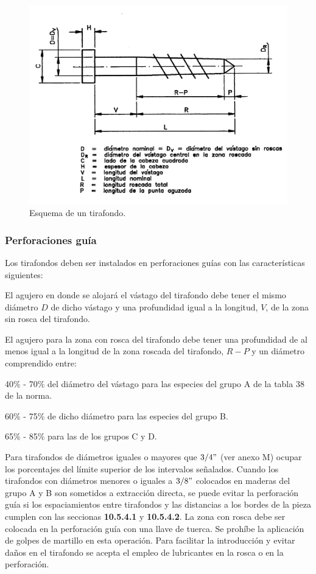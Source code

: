 \begin{figure}[H]
\centering
\includegraphics[width=0.9\linewidth]{Imagenes/figura_28.pdf}%
\caption{Esquema de un tirafondo. \cite{nch1198}}
\label{fig:nch_28}
\end{figure}

\newpage

\subsubsection{Perforaciones guía}
Los tirafondos deben ser instalados en perforaciones guías con las características siguientes:
\begin{itemize*}
	\item El agujero en donde se alojará el vástago del tirafondo debe tener el mismo diámetro $D$ de dicho vástago y una profundidad igual a la longitud, $V$, de la zona sin rosca del tirafondo.
	\item El agujero para la zona con rosca del tirafondo debe tener una profundidad de al menos igual a la longitud de la zona roscada del tirafondo, $R-P$ y un diámetro comprendido entre:
	\begin{itemize*}
		\item 40\% - 70\% del diámetro del vástago para las especies del grupo A de la tabla 38 de la norma.
		\item 60\% - 75\% de dicho diámetro para las especies del grupo B.
		\item 65\% - 85\% para las de los grupos C y D.
	\end{itemize*}
\end{itemize*}
Para tirafondos de diámetros iguales o mayores que $3/4"$ (ver anexo M) ocupar los porcentajes del límite superior de los intervalos señalados. Cuando los tirafondos con diámetros menores o iguales a $3/8"$ colocados en maderas del grupo A y B son sometidos a extracción directa, se puede evitar la perforación guía si los espaciamientos entre tirafondos y las distancias a los bordes de la pieza cumplen con las seccionas \textbf{10.5.4.1} y \textbf{10.5.4.2}.
La zona con rosca debe ser colocada en la perforación guía con una llave de tuerca. Se prohíbe la aplicación de golpes de martillo en esta operación. Para facilitar la introducción y evitar daños en el tirafondo se acepta el empleo de lubricantes en la rosca o en la perforación.

